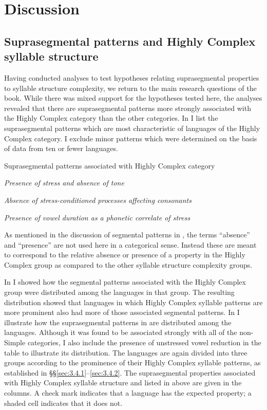 \section{Discussion}\label{sec:5.5}
\subsection{Suprasegmental patterns and Highly Complex syllable structure}\label{sec:5.5.1}

  Having conducted analyses to test hypotheses relating suprasegmental properties to syllable structure complexity, we return to the main research questions of the book. While there was mixed support for the hypotheses tested here, the analyses revealed that there are suprasegmental patterns more strongly associated with the Highly Complex category than the other categories. In  I list the suprasegmental patterns which are most characteristic of languages of the Highly Complex category. I exclude minor patterns which were determined on the basis of data from ten or fewer languages.

\ea\label{ex:5.27}
  Suprasegmental patterns associated with Highly Complex category

\textit{Presence of stress and absence of tone}

\textit{Absence of stress-conditioned processes affecting consonants}

\textit{Presence of vowel duration as a phonetic correlate of stress}
\z

  As mentioned in the discussion of segmental patterns in , the terms ``absence'' and ``presence'' are not used here in a categorical sense. Instead these are meant to correspond to the relative absence or presence of a property in the Highly Complex group as compared to the other syllable structure complexity groups.

  In  I showed how the segmental patterns associated with the Highly Complex group were distributed among the languages in that group. The resulting distribution showed that languages in which Highly Complex syllable patterns are more prominent also had more of those associated segmental patterns. In  I illustrate how the suprasegmental patterns in  are distributed among the languages. Although it was found to be associated strongly with all of the non-Simple categories, I also include the presence of unstressed vowel reduction in the table to illustrate its distribution. The languages are again divided into three groups according to the prominence of their Highly Complex syllable patterns, as established in §§\ref{sec:3.4.1}--\ref{sec:3.4.2}. The suprasegmental properties associated with Highly Complex syllable structure and listed in  above are given in the columns. A check mark indicates that a language has the expected property; a shaded cell indicates that it does not. 

